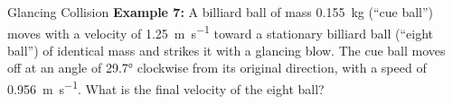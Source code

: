 \documentclass[12pt,compress,aspectratio=169]{beamer}
\begin{document}
\begin{frame}{Glancing Collision}
  \vspace{.3in}\textbf{Example 7:} A billiard ball of mass \SI{.155}{\kilo\gram}
  (``cue ball'') moves with a velocity of \SI{1.25}{\metre\per\second} toward
  a stationary billiard ball (``eight ball'') of identical mass and strikes it
  with a glancing blow. The cue ball moves off at an angle of \ang{29.7}
  clockwise from its original direction, with a speed of
  \SI{.956}{\metre\per\second}. What is the final velocity of the eight ball?
\end{frame}



%
%
%
%
%
%
\end{document}
